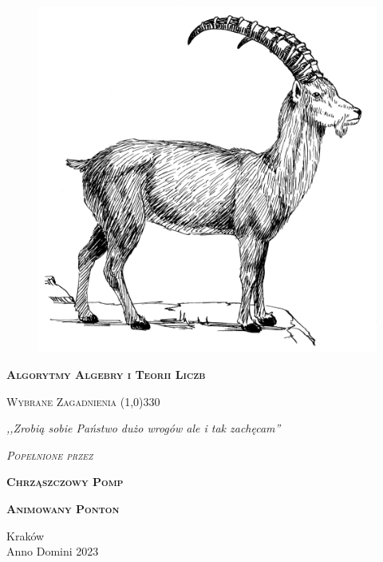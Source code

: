 \begin{titlepage} 
    \begin{center}
         \begin{figure}[h]
            \centering
            \includegraphics[scale]{img/goat.png}
        \end{figure}
        
        \Huge
        \textbf{\textsc{Algorytmy Algebry i Teorii Liczb}}
        
        \vspace{0.5cm}
        \Large
        \textsc{Wybrane Zagadnienia}
        \line(1,0){330}
        
        \normalsize
        
        \vspace{1cm}
        \textit{,,Zrobią sobie Państwo dużo wrogów ale i tak zachęcam''}
        \vspace{1cm}

        \textit{\textsc{Popełnione przez}}\\
        \vspace{5mm}
  
        \textbf{\textsc{Chrząszczowy Pomp}}
  
        \textbf{\textsc{Animowany Ponton}}
 
        \vfill

        Kraków \\
        Anno Domini 2023
    \end{center}
\end{titlepage}